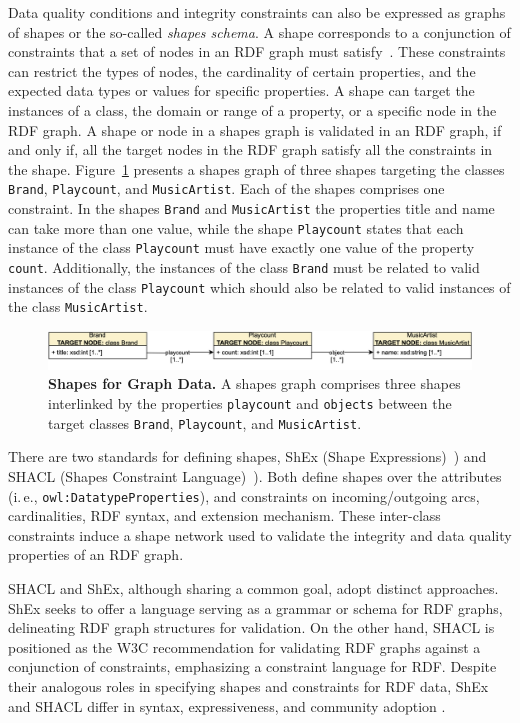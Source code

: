 \documentclass[a4paper,USenglish]{tgdk-v2021}
\begin{document}
Data quality conditions and integrity constraints can also be expressed as graphs of shapes or the so-called \emph{shapes schema}. 
A shape corresponds to a conjunction of constraints that a set of nodes in an RDF graph must satisfy~\cite{DBLP:series/synthesis/2021Hogan}.
These constraints can restrict the types of nodes, the cardinality of certain properties, and the expected data types or values for specific properties. A shape can target the instances of a class, the domain or range of a property, or a specific node in the RDF graph. A shape or node in a shapes graph is validated in an RDF graph, if and only if, all the target nodes in the RDF graph satisfy all the constraints in the shape.
Figure~\ref{fig:shape} presents a shapes graph of three shapes targeting the classes  
\texttt{Brand}, \texttt{Playcount}, and \texttt{MusicArtist}. Each of the shapes comprises one constraint. In the shapes \texttt{Brand} and \texttt{MusicArtist} the properties title and name can take more than one value, while the shape \texttt{Playcount} states that each instance of the class \texttt{Playcount} must have exactly one value of the property \texttt{count}. Additionally, the instances of the class \texttt{Brand} must be related to valid instances of the class \texttt{Playcount} which should also be related to valid instances of the class \texttt{MusicArtist}.

\begin{figure}[!ht]
\centering
\includegraphics[width=1\textwidth]{figs/SHACLExample.png}
\caption{\textbf{Shapes for Graph Data.} A shapes graph comprises three shapes interlinked by the properties \texttt{playcount} and \texttt{objects} between the target classes \texttt{Brand}, \texttt{Playcount}, and \texttt{MusicArtist}.}
\label{fig:shape}
\end{figure}
  
There are two standards for defining shapes, ShEx (Shape Expressions)~\cite{SHEX}) and SHACL (Shapes Constraint Language)~\cite{SHACL}).
Both define shapes over the attributes (i.\,e., \texttt{owl:Datatype\-Properties}), and constraints on incoming/outgoing arcs, cardinalities, RDF syntax, and extension mechanism. These inter-class constraints induce a shape network used to validate the integrity and data quality properties of an RDF graph. 
 
SHACL and ShEx, although sharing a common goal, adopt distinct approaches. ShEx seeks to offer a language serving as a grammar or schema for RDF graphs, delineating RDF graph structures for validation. On the other hand, SHACL is positioned as the W3C recommendation for validating RDF graphs against a conjunction of constraints, emphasizing a constraint language for RDF. Despite their analogous roles in specifying shapes and constraints for RDF data, ShEx and SHACL differ in syntax, expressiveness, and community adoption \cite{DBLP:series/synthesis/2017Gayo}.
\end{document}
